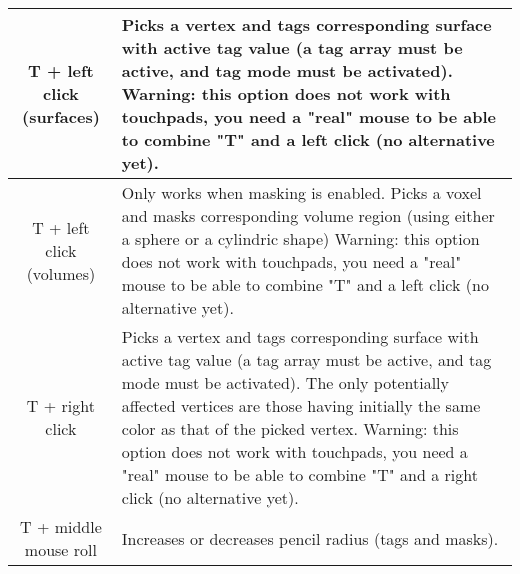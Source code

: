 \begin{tabularx}{\linewidth}{ | c | X | }
T + left click (surfaces) & Picks a vertex and tags corresponding surface with active tag value (a tag array must be active, and tag mode must be activated). Warning: this option does not work with touchpads, you need a "real" mouse to be able to combine "T" and a left click (no alternative yet).  \\ \hline			
T + left click (volumes) & Only works when masking is enabled. Picks a voxel and masks corresponding volume region (using either a sphere or a cylindric shape) Warning: this option does not work with touchpads, you need a "real" mouse to be able to combine "T" and a left click (no alternative yet).  \\ \hline			 

T + right click & Picks a vertex and tags corresponding surface with active tag value (a tag array must be active, and tag mode must be activated). The only potentially affected vertices are those having initially the same color as that of the picked vertex. Warning: this option does not work with touchpads, you need a "real" mouse to be able to combine "T" and a right click (no alternative yet).  \\ \hline			

T + middle mouse roll & Increases or decreases pencil radius (tags and masks).  \\ \hline			
\end{tabularx}

